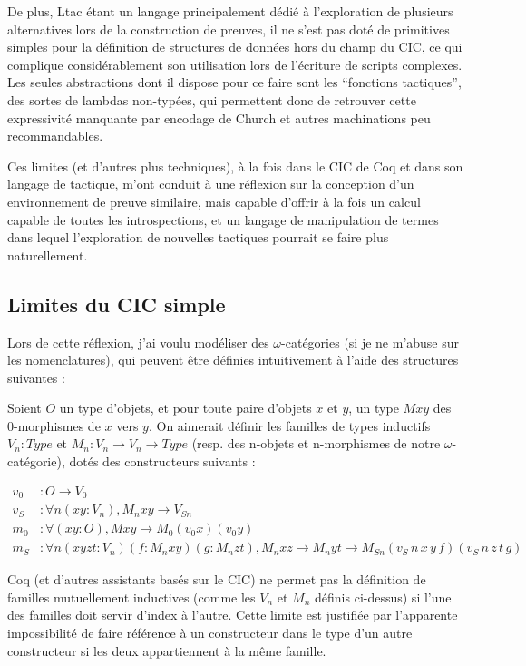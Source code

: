 \documentclass[]{easychair}
\begin{document}
De plus, Ltac étant un langage principalement dédié à l'exploration de
plusieurs alternatives lors de la construction de preuves, il ne s'est
pas doté de primitives simples pour la définition de structures de
données hors du champ du CIC, ce qui complique considérablement son
utilisation lors de l'écriture de scripts complexes. Les seules
abstractions dont il dispose pour ce faire sont les ``fonctions
tactiques'', des sortes de lambdas non-typées, qui permettent donc de
retrouver cette expressivité manquante par encodage de Church et autres
machinations peu recommandables.

Ces limites (et d'autres plus techniques), à la fois dans le CIC de Coq
et dans son langage de tactique, m'ont conduit à une réflexion sur la
conception d'un environnement de preuve similaire, mais capable d'offrir
à la fois un calcul capable de toutes les introspections, et un langage
de manipulation de termes dans lequel l'exploration de nouvelles
tactiques pourrait se faire plus naturellement.

\subsection{Limites du CIC simple}\label{limites-du-cic-simple}

Lors de cette réflexion, j'ai voulu modéliser des \(\omega\)-catégories
(si je ne m'abuse sur les nomenclatures), qui peuvent être définies
intuitivement à l'aide des structures suivantes :

Soient \(O\) un type d'objets, et pour toute paire d'objets \(x\) et
\(y\), un type \(M x y\) des 0-morphismes de \(x\) vers \(y\). On
aimerait définir les familles de types inductifs \(V_{n} : Type\) et
\(M_{n} : V_{n} \rightarrow V_{n} \rightarrow Type\) (resp. des n-objets
et n-morphismes de notre \(\omega\)-catégorie), dotés des constructeurs
suivants :

\begin{align*}
v_0 &: O \rightarrow V_{0} \\
v_S &: \forall n (x y : V_{n}), M_{n} x y \rightarrow V_{S n} \\
m_0 &: \forall (x y : O), M x y \rightarrow M_{0} (v_0 x) (v_0 y) \\
m_S &: \forall n (x y z t : V_{n}) (f : M_{n} x y) (g : M_{n} z t), M_{n} x z \rightarrow M_{n} y t \rightarrow M_{S n} (v_S\,n\,x\,y\,f) (v_S\,n\,z\,t\,g) 
\end{align*}

Coq (et d'autres assistants basés sur le CIC) ne permet pas la
définition de familles mutuellement inductives (comme les \(V_n\) et
\(M_n\) définis ci-dessus) si l'une des familles doit servir d'index à
l'autre. Cette limite est justifiée par l'apparente impossibilité de
faire référence à un constructeur dans le type d'un autre constructeur
si les deux appartiennent à la même famille.
\end{document}
